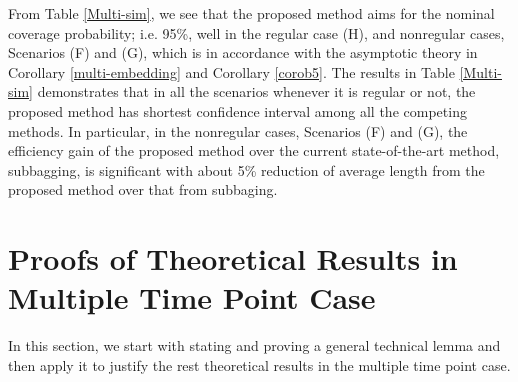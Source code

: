 \documentclass[11pt]{article}
\theoremstyle{referenceplain}
\theoremstyle{referencedefinition}
\theoremstyle{referenceremark}
\begin{document}
From Table \ref{Multi-sim}, we see that the proposed method aims for the nominal coverage probability; i.e. 95\%, well in the regular case (H), and nonregular cases, Scenarios (F) and (G), which is in accordance with the asymptotic theory in Corollary \ref{multi-embedding} and Corollary \ref{corob5}. The results in Table \ref{Multi-sim} demonstrates that in all the scenarios whenever it is regular or not, the proposed method has shortest confidence interval among all the competing methods. In particular, in the nonregular cases, Scenarios (F) and (G), the efficiency gain of the proposed method over the current state-of-the-art method, subbagging, is significant with about 5\% reduction of average length from the proposed method over that from subbaging. 



\section{Proofs of Theoretical Results in Multiple Time Point Case}\label{appC}
In this section, we start with stating and proving a general technical lemma and then apply it to justify the rest theoretical results in the multiple time point case.
\end{document}
